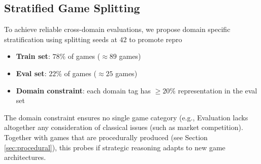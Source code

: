 \subsection{Stratified Game Splitting}
\label{sec:splitting}

To achieve reliable cross-domain evaluations, we propose domain specific stratification using splitting seeds at $42$ to promote repro

\begin{itemize}[nosep]
    \item \textbf{Train set}: $78\%$ of games ($\approx 89$ games)
    \item \textbf{Eval set}: $22\%$ of games ($\approx 25$ games)
    \item \textbf{Domain constraint}: each domain tag has $\geq 20\%$
          representation in the eval set
\end{itemize}

\noindent The domain constraint ensures no single game category (e.g.,
Evaluation lacks altogether any consideration of classical issues (such as market competition). Together with games that are procedurally produced (see Section \ref{sec:procedural}), this probes if strategic reasoning adapts to new game architectures.
